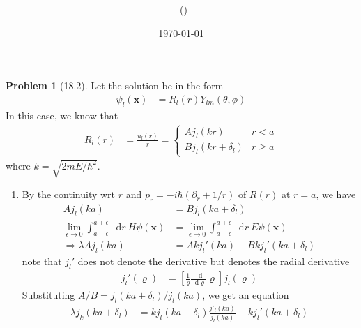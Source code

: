 \documentclass[twoside,11pt]{article}
\title{{\lms \Code \ \Ass}}
\author{\lms \name \ (\href{mailto:\mail}{\mail})}
\date{\sffamily \today}
\makeatletter
\renewcommand*\d{\mathop{}\!\mathrm{d}}
\theoremstyle{definition}
\newtheorem{problem}{Problem}
\theoremstyle{remark}
\newtheorem*{remark}{Remark}
\renewcommand{\maketitle}{\bgroup\setlength{\parindent}{0pt}
\begin{flushleft}
  \textbf{\Large\@title}

  \@author
\end{flushleft}\egroup
}
\makeatother
\begin{document}
\maketitle
\thispagestyle{title}



\begin{problem}[18.2]
Let the solution be in the form
\begin{align*}
    \psi_l(\mathbf{x}) &= R_l(r)Y_{lm}(\theta, \phi)
\end{align*}
In this case, we know that 
\begin{align*}
    R_l(r) &= \frac{u_l(r)}{r} = \begin{cases}
        A j_l(kr) & r < a\\
        B j_l(kr+\delta_l) & r \geq a
    \end{cases}
\end{align*}
where $k=\sqrt{2mE/\hbar^2}$.
\begin{enumerate}[label=(\alph*)]
\item By the continuity wrt $r$ and $p_r=-i\hbar(\partial_r + 1/r)$ of $R(r)$
at $r=a$, we have
\begin{align*}
    Aj_l(ka) &= B j_l(ka+\delta_l)\\
    \lim_{\epsilon\rightarrow 0}
    \int_{a-\epsilon}^{a+\epsilon} \d r\ H\psi(\mathbf{x}) &= 
    \lim_{\epsilon\rightarrow 0}
    \int_{a-\epsilon}^{a+\epsilon} \d r\ E\psi(\mathbf{x})\\
    \Rightarrow
    \lambda Aj_l(ka) &= 
    Akj_l'(ka) - Bkj_l'(ka+\delta_l)
\end{align*}
note that $j_l'$ does not denote the derivative but denotes the radial derivative
\begin{align*}
    j_l'(\varrho) &= \left[\frac{1}{\varrho}\frac{\d}{\d\varrho}\varrho\right] j_l(\varrho)
\end{align*}
Substituting $A/B = j_l(ka+\delta_l)/j_l(ka)$, we get an equation
\begin{align*}
    \lambda j_k(ka+\delta_l) &= 
    kj_l(ka+\delta_l)\frac{j'_l(ka)}{j_l(ka)} - 
    kj_l'(ka+\delta_l)\\

\end{align*}
\end{enumerate}
\end{problem}
\end{document}
